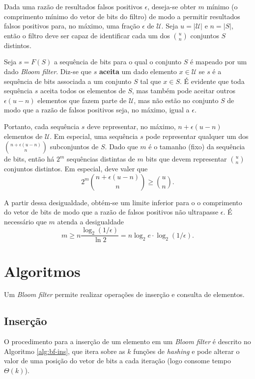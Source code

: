 \documentclass[12pt,twoside,english,brazilian]{book}
\begin{document}
Dada uma razão de resultados falsos positivos $\epsilon$, deseja-se obter $m$ mínimo (o comprimento mínimo do vetor de bits do filtro) de modo a permitir resultados falsos positivos para, no máximo, uma fração $\epsilon$ de $\mathcal{U}$. Seja $u = |\mathcal{U}|$ e $n = |S|$, então o filtro deve ser capaz de identificar cada um dos $\binom{u}{n}$ conjuntos $S$ distintos.

Seja $s = F(S)$ a sequência de bits para o qual o conjunto $S$ é mapeado por um dado \textit{Bloom filter}. Diz-se que $s$ \textbf{aceita} um dado elemento $x \in \mathcal{U}$ se $s$ é a sequência de bits associada a um conjunto $S$ tal que $x \in S$. É evidente que toda sequência $s$ aceita todos os elementos de $S$, mas também pode aceitar outros $\epsilon(u-n)$ elementos que fazem parte de $\mathcal{U}$, mas não estão no conjunto $S$ de modo que a razão de falsos positivos seja, no máximo, igual a $\epsilon$.

Portanto, cada sequência $s$ deve representar, no máximo, $n + \epsilon(u-n)$ elementos de $\mathcal{U}$. Em especial, uma sequência $s$ pode representar qualquer um dos $\binom{n + \epsilon(u - n)}{n}$ subconjuntos de $S$. Dado que $m$ é o tamanho (fixo) da sequência de bits, então há $2^m$ sequências distintas de $m$ bits que devem representar $\binom{u}{n}$ conjuntos distintos. Em especial, deve valer que $$2^m \binom{n + \epsilon(u - n)}{n} \geq \binom{u}{n}.$$

A partir dessa desigualdade, obtém-se um limite inferior para o o comprimento do vetor de bits de modo que a razão de falsos positivos não ultrapasse $\epsilon$. É necessário que $m$ atenda a desigualdade $$m \geq n \frac{\log_2(1/\epsilon)}{\ln 2} = n\log_2{e} \cdot \log_2{(1/\epsilon)}.$$

\section{Algoritmos}

Um \textit{Bloom filter} permite realizar operações de inserção e consulta de elementos.

\subsection{Inserção}

O procedimento para a inserção de um elemento em um \textit{Bloom filter} é descrito no Algoritmo \ref{alg:bf-ins}, que itera sobre as $k$ funções de \textit{hashing}  e pode alterar o valor de uma posição do vetor de bits a cada iteração (logo consome tempo $\Theta(k)$).
\end{document}
